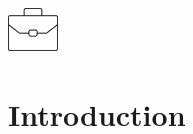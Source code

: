 \documentclass[11pt]{article}
\begin{document}
\begin{titlepage}
\begin{minipage}{0.4\textwidth}
\begin{flushright}
\end{flushright}
\end{minipage}\\[2cm]






\includegraphics[width=50px, keepaspectratio]{Briefcase.png}\\[1cm] %
 

\vfill %

\end{titlepage}

\tableofcontents

\newpage

\section{Introduction}
\end{document}
